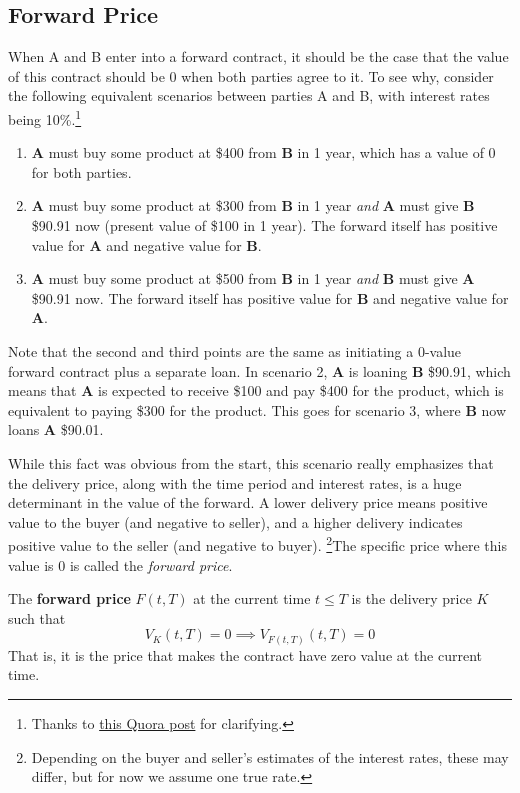\documentclass{article}
\begin{document}
  \subsection{Forward Price}

    When A and B enter into a forward contract, it should be the case that the value of this contract should be $0$ when both parties agree to it. To see why, consider the following equivalent scenarios between parties A and B, with interest rates being 10\%.\footnote{Thanks to \href{https://www.quora.com/Why-is-the-initial-value-of-a-forward-contract-set-to-zero}{this Quora post} for clarifying. } 

    \begin{enumerate}
      \item \textbf{A} must buy some product at \$400 from \textbf{B} in 1 year, which has a value of $0$ for both parties.  
      \item \textbf{A} must buy some product at \$300 from \textbf{B} in 1 year \textit{and} \textbf{A} must give \textbf{B} \$90.91 now (present value of \$100 in 1 year). The forward itself has positive value for \textbf{A} and negative value for \textbf{B}. 
      \item \textbf{A} must buy some product at \$500 from \textbf{B} in 1 year \textit{and} \textbf{B} must give \textbf{A} \$90.91 now. The forward itself has positive value for \textbf{B} and negative value for \textbf{A}. 
    \end{enumerate}
    Note that the second and third points are the same as initiating a $0$-value forward contract plus a separate loan. In scenario 2, \textbf{A} is loaning \textbf{B} \$90.91, which means that \textbf{A} is expected to receive \$100 and pay \$400 for the product, which is equivalent to paying \$300 for the product. This goes for scenario 3, where \textbf{B} now loans \textbf{A} \$90.01. 

    While this fact was obvious from the start, this scenario really emphasizes that the delivery price, along with the time period and interest rates, is a huge determinant in the value of the forward. A lower delivery price means positive value to the buyer (and negative to seller), and a higher delivery indicates positive value to the seller (and negative to buyer). \footnote{Depending on the buyer and seller's estimates of the interest rates, these may differ, but for now we assume one true rate. }The specific price where this value is $0$ is called the \textit{forward price}.

    \begin{definition}
      The \textbf{forward price} $F(t, T)$ at the current time $t \leq T$ is the delivery price $K$ such that 
      \begin{equation}
        V_K (t, T) = 0 \implies V_{F(t, T)} (t, T) = 0 
      \end{equation}
      That is, it is the price that makes the contract have zero value at the current time. 
    \end{definition}
\end{document}

